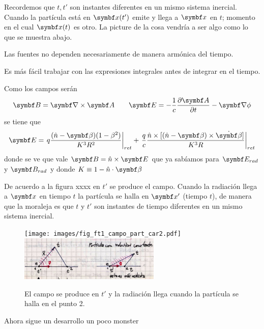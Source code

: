 \documentclass[10pt,oneside]{CBFT_book}
\begin{document}
Recordemos que $t,t'$ son instantes diferentes en un mismo sistema inercial.
Cuando la partícula está en $\vbx(t')$ emite y llega a $\vbx$ en $t$; momento en el cual 
$\vbx(t)$ es otro. La picture de la cosa vendría a ser algo como lo que se muestra abajo.

Las fuentes no dependen necesariamente de manera armónica del tiempo.

Es más fácil trabajar con las expresiones integrales antes de integrar en el tiempo.


Como los campos serán 
\[
	\vb{B} = \rotorm{A} \qquad \vb{E} = -\frac{1}{c}\dpar{\vb{A}}{t} - \Nabla\phi
\]
se tiene que 
\[
	\vb{E} = \left. q \frac{ (\hat{n}-\vb{\beta})(1-\beta^2)}{K^3R^2} \right|_{ret} + \left. 
	\frac{q}{c} \frac{\hat{n}\times[ (\hat{n}-\vb{\beta})\times \dot{\vb{\beta}} ]}{K^3R} \right|_{ret}
\]
donde se ve que vale $\vb{B} = \hat{n} \times \vb{E}$ que ya sabíamos para $\vb{E}_{rad}$ y $\vb{B}_{rad}$
y donde $K\equiv 1 - \hat{n}\cdot\vb{\beta} $

De acuerdo a la figura xxxx en $t'$ se produce el campo. Cuando la radiación llega a $\vb{x}$ en tiempo $t$ 
la partícula se halla en $\vb{x}'$ (tiempo $t$), de manera que la moraleja es que $t$ y $t'$ son instantes
de tiempo diferentes en un mismo sistema inercial.

\begin{figure}[htb]
	\begin{center}
	\texttt{[image: images/fig\_ft1\_campo\_part\_car2.pdf]}
	\includegraphics[width=0.6\textwidth]{images/fig_ft1_campo_part_car2JPG.jpg}
	\end{center}
	\caption{El campo se produce en $t'$ y la radiación llega cuando la partícula se halla
	en el punto 2.}
\end{figure} 

Ahora sigue un desarrollo un poco monster
\end{document}
